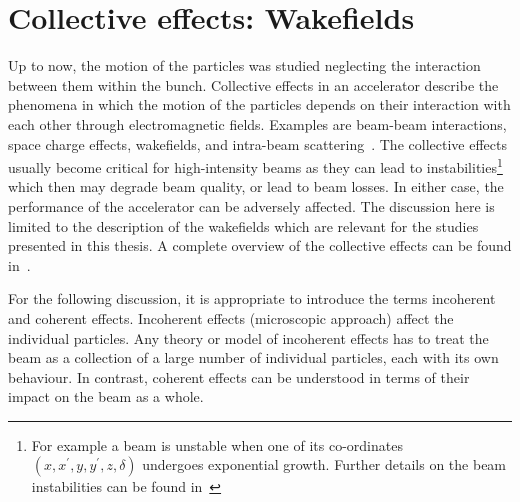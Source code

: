\section{Collective effects: Wakefields}\label{sec:collective_effects}
Up to now, the motion of the particles was studied neglecting the interaction between them within the bunch. Collective effects in an accelerator describe the phenomena in which the motion of the particles depends on their interaction with each other through electromagnetic fields. Examples are beam-beam interactions, space charge effects, wakefields, and intra-beam scattering~\cite{Zimmermann:2264408}. The collective effects usually become critical for high-intensity beams as they can lead to instabilities\footnote{For example a beam is unstable when one of its co-ordinates $(x, x^\prime, y, y^\prime, z, \delta)$ undergoes exponential growth. Further details on the beam instabilities can be found in~\cite{Rumolo:1982422}} which then may degrade beam quality, or lead to beam losses. In either case, the performance of the accelerator can be adversely affected. The discussion here is limited to the description of the wakefields which are relevant for the studies presented in this thesis. A complete overview of the collective effects can be found in~\cite{wolski2014, Zimmermann:2264408, Chao:collective}.



For the following discussion, it is appropriate to introduce the terms incoherent and coherent effects. Incoherent effects (microscopic approach) affect the individual particles. Any theory or model of incoherent effects has to treat the beam as a collection of a large number of individual particles, each with its own behaviour. In contrast, coherent effects can be understood in terms of their impact on the beam as a whole.%


